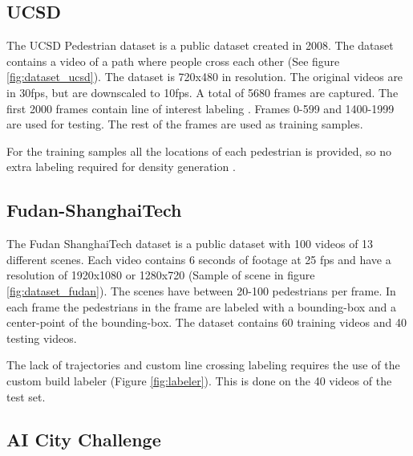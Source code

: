 \subsection{UCSD}
The UCSD Pedestrian dataset \cite{Chan2008} is a public dataset created in 2008. The dataset contains a video of a path where people cross each other (See figure \ref{fig:dataset_ucsd}). The dataset is 720x480 in resolution. The original videos are in 30fps, but are downscaled to 10fps. A total of 5680 frames are captured. The first 2000 frames contain line of interest labeling \cite{Ma2013}. Frames 0-599 and 1400-1999 are used for testing. The rest of the frames are used as training samples.

For the training samples all the locations of each pedestrian is provided, so no extra labeling required for density generation \cite{Chan2012}.

\subsection{Fudan-ShanghaiTech}
The Fudan ShanghaiTech dataset \cite{Fang2019} is a public dataset with 100 videos of 13 different scenes. Each video contains 6 seconds of footage at 25 fps and have a resolution of 1920x1080 or 1280x720 (Sample of scene in figure \ref{fig:dataset_fudan}). The scenes have between 20-100 pedestrians per frame. In each frame the pedestrians in the frame are labeled with a bounding-box and a center-point of the bounding-box. The dataset contains 60 training videos and 40 testing videos.

The lack of trajectories and custom line crossing labeling requires the use of the custom build labeler (Figure \ref{fig:labeler}). This is done on the 40 videos of the test set.

\subsection{AI City Challenge}
